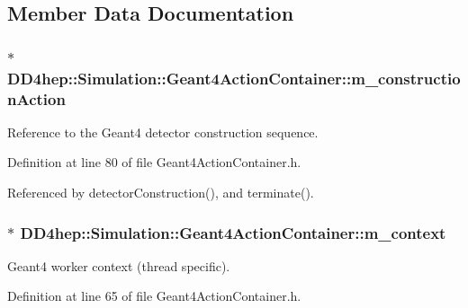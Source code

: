 \subsection{Member Data Documentation}
\hypertarget{class_d_d4hep_1_1_simulation_1_1_geant4_action_container_a98e2929884380e696c80a9c50c072afe}{
\subsubsection[{m\_\-constructionAction}]{$\ast$ {\bf DD4hep::Simulation::Geant4ActionContainer::m\_\-constructionAction}}}
\label{class_d_d4hep_1_1_simulation_1_1_geant4_action_container_a98e2929884380e696c80a9c50c072afe}


Reference to the Geant4 detector construction sequence. 

Definition at line 80 of file Geant4ActionContainer.h.

Referenced by detectorConstruction(), and terminate().\hypertarget{class_d_d4hep_1_1_simulation_1_1_geant4_action_container_a72ed1f7c3f20c13479de89ebdfd10e77}{
\subsubsection[{m\_\-context}]{$\ast$ {\bf DD4hep::Simulation::Geant4ActionContainer::m\_\-context}}}
\label{class_d_d4hep_1_1_simulation_1_1_geant4_action_container_a72ed1f7c3f20c13479de89ebdfd10e77}


Geant4 worker context (thread specific). 

Definition at line 65 of file Geant4ActionContainer.h.


